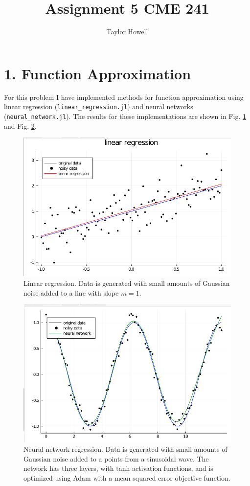 \documentclass[12pt]{article}
\title{Assignment 5 CME 241}
\author{Taylor Howell}
\begin{document}
\maketitle

\newpage
\section*{1. Function Approximation}
For this problem I have implemented methods for function approximation using linear regression (\texttt{linear\_regression.jl}) and neural networks (\texttt{neural\_network.jl}). The results for these implementations are shown in Fig. \ref{linear_regression} and Fig. \ref{neural_network}.
\begin{figure}[!htb]
	\centering
	\includegraphics[width=.75\textwidth]{ipad/linear_regression.png}
	\caption{Linear regression. Data is generated with small amounts of Gaussian noise added to a line with slope $m = 1$.}
	\label{linear_regression}
\end{figure}

\begin{figure}[!htb]
	\centering
	\includegraphics[width=.75\textwidth]{ipad/neural_network.png}
	\caption{Neural-network regression. Data is generated with small amounts of Gaussian noise added to a points from a sinusoidal wave. The network has three layers, with tanh activation functions, and is optimized using Adam with a mean squared error objective function.}
	\label{neural_network}
\end{figure}

\clearpage
\end{document}
